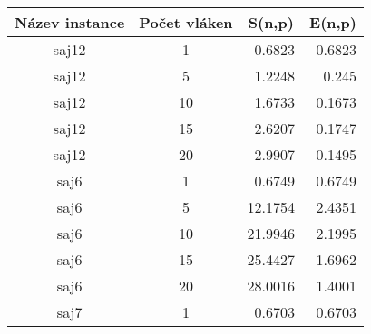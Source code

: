 \documentclass{article} \oddsidemargin=-5mm
\begin{document}
\begin{table}[h]
\centering
\begin{tabular}{|c|c|r|r|}
\hline
\rowcolor[HTML]{C0C0C0} 
\textbf{Název instance} & \textbf{Počet vláken} & \multicolumn{1}{c|}{\cellcolor[HTML]{C0C0C0}\textbf{S(n,p)}} & \multicolumn{1}{c|}{\cellcolor[HTML]{C0C0C0}\textbf{E(n,p)}} \\ \hline
saj12             & 1                  & 0.6823                                                       & 0.6823                                                       \\ \hline
saj12             & 5                  & 1.2248                                                       & 0.245                                                        \\ \hline
saj12             & 10                 & 1.6733                                                       & 0.1673                                                       \\ \hline
saj12             & 15                 & 2.6207                                                       & 0.1747                                                       \\ \hline
saj12             & 20                 & 2.9907                                                       & 0.1495                                                       \\ \hline
saj6              & 1                  & 0.6749                                                       & 0.6749                                                       \\ \hline
saj6              & 5                  & 12.1754                                                      & 2.4351                                                       \\ \hline
saj6              & 10                 & 21.9946                                                      & 2.1995                                                       \\ \hline
saj6              & 15                 & 25.4427                                                      & 1.6962                                                       \\ \hline
saj6              & 20                 & 28.0016                                                      & 1.4001                                                       \\ \hline
saj7              & 1                  & 0.6703                                                       & 0.6703                                                       \\ \hline

\end{tabular}
\end{table}
\end{document}
